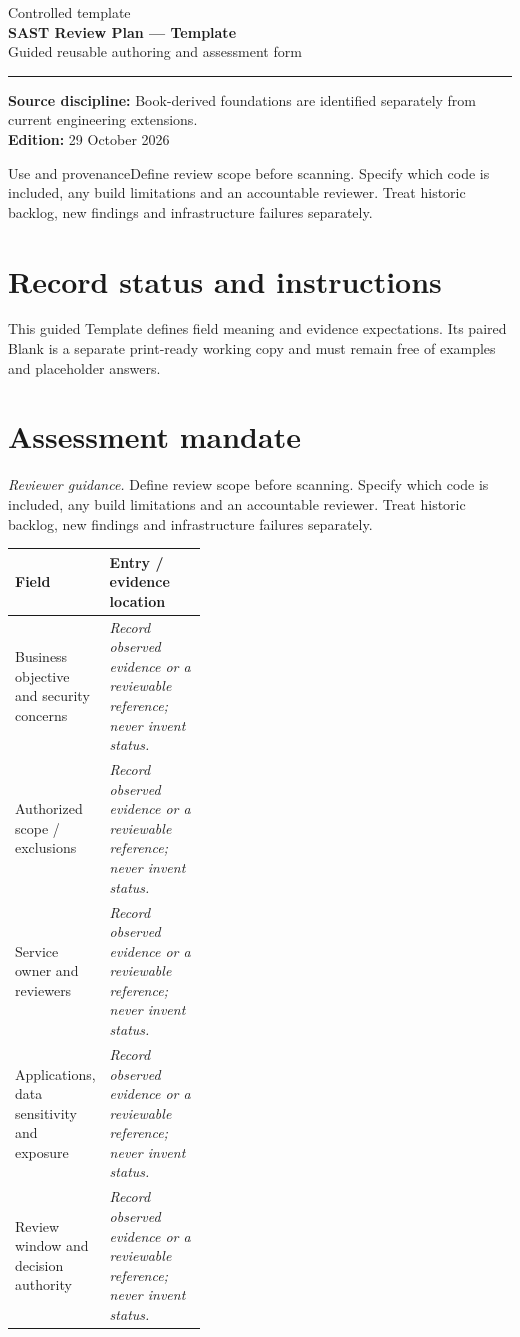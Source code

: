 \documentclass[10pt,letterpaper]{article}
\begin{document}
\hypersetup{pageanchor=false}%
\begin{titlepage}
\vspace*{1.0in}
{\color{bluegray}\Large Controlled template}\\[1.0em]
{\color{navy}\Huge\bfseries SAST Review Plan --- Template}\\[0.7em]
{\Large Guided reusable authoring and assessment form}\\[2.0em]
\rule{\linewidth}{1.0pt}
\vfill
\textbf{Source discipline:} Book-derived foundations are identified separately from current engineering extensions.\\
\textbf{Edition:} 29 October 2026
\end{titlepage}\hypersetup{pageanchor=true}
\tableofcontents
\clearpage
\begin{focusbox}{Use and provenance}Define review scope before scanning. Specify which code is included, any build limitations and an accountable reviewer. Treat historic backlog, new findings and infrastructure failures separately.\end{focusbox}
\section{Record status and instructions}
This guided Template defines field meaning and evidence expectations. Its paired Blank is a separate print-ready working copy and must remain free of examples and placeholder answers.

\section{Assessment mandate}
\textit{Reviewer guidance.} Define review scope before scanning. Specify which code is included, any build limitations and an accountable reviewer. Treat historic backlog, new findings and infrastructure failures separately.
\begin{tabularx}{\linewidth}{@{}p{0.38\linewidth}Y@{}}
\toprule Field & Entry / evidence location\\\midrule
Business objective and security concerns & \textit{Record observed evidence or a reviewable reference; never invent status.}\\[1.0em]
\midrule
Authorized scope / exclusions & \textit{Record observed evidence or a reviewable reference; never invent status.}\\[1.0em]
\midrule
Service owner and reviewers & \textit{Record observed evidence or a reviewable reference; never invent status.}\\[1.0em]
\midrule
Applications, data sensitivity and exposure & \textit{Record observed evidence or a reviewable reference; never invent status.}\\[1.0em]
\midrule
Review window and decision authority & \textit{Record observed evidence or a reviewable reference; never invent status.}\\[1.0em]
\midrule
\end{tabularx}
\end{document}
